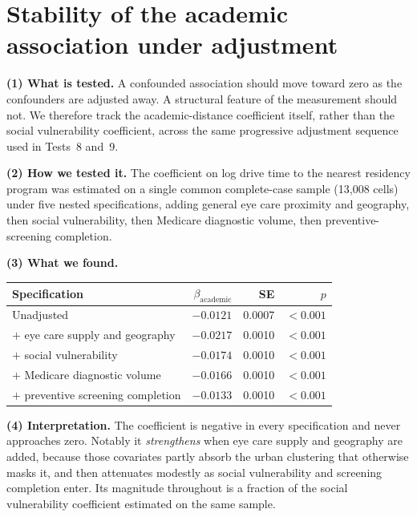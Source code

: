\documentclass[11pt]{article}
\newcommand{\tpart}[1]{\medskip\noindent\textbf{#1}\quad}
\begin{document}
\section{Stability of the academic association under adjustment}

\tpart{(1) What is tested.} A confounded association should move toward zero as
the confounders are adjusted away. A structural feature of the measurement
should not. We therefore track the academic-distance coefficient itself, rather
than the social vulnerability coefficient, across the same progressive
adjustment sequence used in Tests~8 and~9.

\tpart{(2) How we tested it.} The coefficient on log drive time to the nearest
residency program was estimated on a single common complete-case sample (13,008
cells) under five nested specifications, adding general eye care proximity and
geography, then social vulnerability, then Medicare diagnostic volume, then
preventive-screening completion.

\tpart{(3) What we found.}
\begin{center}
\begin{tabular}{lrrr}
\toprule
Specification & $\beta_{\mathrm{academic}}$ & SE & $p$ \\
\midrule
Unadjusted                              & $-0.0121$ & 0.0007 & $<0.001$ \\
$+$ eye care supply and geography       & $-0.0217$ & 0.0010 & $<0.001$ \\
$+$ social vulnerability                & $-0.0174$ & 0.0010 & $<0.001$ \\
$+$ Medicare diagnostic volume          & $-0.0166$ & 0.0010 & $<0.001$ \\
$+$ preventive screening completion     & $-0.0133$ & 0.0010 & $<0.001$ \\
\bottomrule
\end{tabular}
\end{center}

\tpart{(4) Interpretation.} The coefficient is negative in every specification
and never approaches zero. Notably it \emph{strengthens} when eye care supply
and geography are added, because those covariates partly absorb the urban
clustering that otherwise masks it, and then attenuates modestly as social
vulnerability and screening completion enter. Its magnitude throughout is a
fraction of the social vulnerability coefficient estimated on the same sample.
\end{document}
